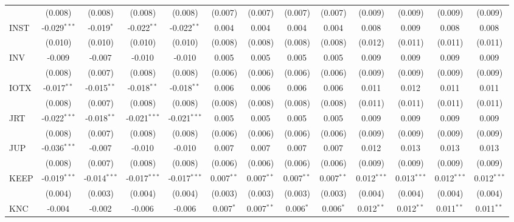 \begin{table}[!htbp]
\begin{tabular}{@{\extracolsep{5pt}}lcccccccccccc}
  & (0.008) & (0.008) & (0.008) & (0.008) & (0.007) & (0.007) & (0.007) & (0.007) & (0.009) & (0.009) & (0.009) & (0.009) \\
 INST & -0.029$^{***}$ & -0.019$^{*}$ & -0.022$^{**}$ & -0.022$^{**}$ & 0.004$^{}$ & 0.004$^{}$ & 0.004$^{}$ & 0.004$^{}$ & 0.008$^{}$ & 0.009$^{}$ & 0.008$^{}$ & 0.008$^{}$ \\
  & (0.010) & (0.010) & (0.010) & (0.010) & (0.008) & (0.008) & (0.008) & (0.008) & (0.012) & (0.011) & (0.011) & (0.011) \\
 INV & -0.009$^{}$ & -0.007$^{}$ & -0.010$^{}$ & -0.010$^{}$ & 0.005$^{}$ & 0.005$^{}$ & 0.005$^{}$ & 0.005$^{}$ & 0.009$^{}$ & 0.009$^{}$ & 0.009$^{}$ & 0.009$^{}$ \\
  & (0.008) & (0.007) & (0.008) & (0.008) & (0.006) & (0.006) & (0.006) & (0.006) & (0.009) & (0.009) & (0.009) & (0.009) \\
 IOTX & -0.017$^{**}$ & -0.015$^{**}$ & -0.018$^{**}$ & -0.018$^{**}$ & 0.006$^{}$ & 0.006$^{}$ & 0.006$^{}$ & 0.006$^{}$ & 0.011$^{}$ & 0.012$^{}$ & 0.011$^{}$ & 0.011$^{}$ \\
  & (0.008) & (0.007) & (0.008) & (0.008) & (0.008) & (0.008) & (0.008) & (0.008) & (0.011) & (0.011) & (0.011) & (0.011) \\
 JRT & -0.022$^{***}$ & -0.018$^{**}$ & -0.021$^{***}$ & -0.021$^{***}$ & 0.005$^{}$ & 0.005$^{}$ & 0.005$^{}$ & 0.005$^{}$ & 0.009$^{}$ & 0.009$^{}$ & 0.009$^{}$ & 0.009$^{}$ \\
  & (0.008) & (0.007) & (0.008) & (0.008) & (0.006) & (0.006) & (0.006) & (0.006) & (0.009) & (0.009) & (0.009) & (0.009) \\
 JUP & -0.036$^{***}$ & -0.007$^{}$ & -0.010$^{}$ & -0.010$^{}$ & 0.007$^{}$ & 0.007$^{}$ & 0.007$^{}$ & 0.007$^{}$ & 0.012$^{}$ & 0.013$^{}$ & 0.013$^{}$ & 0.013$^{}$ \\
  & (0.008) & (0.007) & (0.008) & (0.008) & (0.006) & (0.006) & (0.006) & (0.006) & (0.009) & (0.009) & (0.009) & (0.009) \\
 KEEP & -0.019$^{***}$ & -0.014$^{***}$ & -0.017$^{***}$ & -0.017$^{***}$ & 0.007$^{**}$ & 0.007$^{**}$ & 0.007$^{**}$ & 0.007$^{**}$ & 0.012$^{***}$ & 0.013$^{***}$ & 0.012$^{***}$ & 0.012$^{***}$ \\
  & (0.004) & (0.003) & (0.004) & (0.004) & (0.003) & (0.003) & (0.003) & (0.003) & (0.004) & (0.004) & (0.004) & (0.004) \\
 KNC & -0.004$^{}$ & -0.002$^{}$ & -0.006$^{}$ & -0.006$^{}$ & 0.007$^{*}$ & 0.007$^{**}$ & 0.006$^{*}$ & 0.006$^{*}$ & 0.012$^{**}$ & 0.012$^{**}$ & 0.011$^{**}$ & 0.011$^{**}$ \\

\end{tabular}
\end{table}
